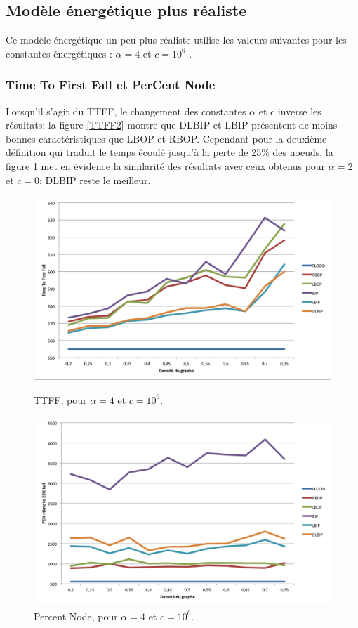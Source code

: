 \subsection{Modèle énergétique plus réaliste}
Ce modèle énergétique un peu plus réaliste utilise les valeurs suivantes pour les constantes énergétiques : $\alpha = 4$ et $c = 10^6$ \cite{Rodoplu1998}.


\subsubsection{Time To First Fall et PerCent Node }
Lorsqu'il s'agit du TTFF, le changement des constantes $\alpha$ et $c$ inverse les résultats: la figure \ref{TTFF2} montre que DLBIP et LBIP présentent de moins bonnes caractéristiques que LBOP et RBOP. Cependant pour la deuxième définition qui 
traduit le temps écoulé jusqu'à la perte de 25\% des noeuds, la figure \ref{PC2} met en évidence la similarité des résultats avec ceux obtenus pour $\alpha = 2$ et $c = 0$: DLBIP reste le meilleur.
\begin{figure}[H]
\begin{bigcenter}
\includegraphics[scale=0.75]{Simus/ttff_4_10p6}
\caption{TTFF, pour $\alpha = 4$ et $c = 10^6$. }
\label{TTFF2}
\end{bigcenter}

\begin{bigcenter}
\includegraphics[scale=0.75]{Simus/pcn_4_10p6}
\caption{Percent Node, pour $\alpha = 4$ et $c = 10^6$.}
\label{PC2}
\end{bigcenter}
\end{figure}


